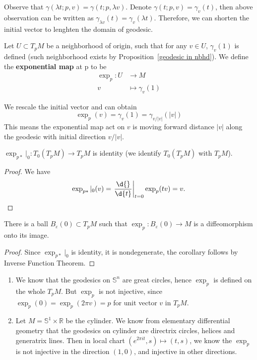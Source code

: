 Observe that $\gamma(\lambda t;p,v)=\gamma(t;p,\lambda v)$.
Denote $\gamma(t;p,v)=\gamma_v(t)$, then above observation can be written as $\gamma_{\lambda v}(t)=\gamma_v(\lambda t)$.
Therefore, we can shorten the initial vector to lenghten the domain of geodesic.

\begin{defn}
    Let $U\subset T_pM$ be a neighborhood of origin, such that for any $v\in U$, $\gamma_v(1)$ is defined (such neighborhood exists by Proposition~\ref{geodesic in nbhd}).
    We define the \textbf{exponential map} at p to be
    \begin{align*}
        \exp_p:U&\to M\\
        v&\mapsto\gamma_v(1)
    \end{align*}
\end{defn}

\begin{rem}
    We rescale the initial vector and can obtain
    \[\exp_p(v)=\gamma_v(1)=\gamma_{v/|v|}(|v|)\]
    This means the exponential map act on $v$ is moving forward distance $|v|$ along the geodesic with initial direction $v/|v|$.
\end{rem}

\begin{prop}
    $\exp_{p*}|_0:T_0(T_pM)\to T_pM$ is identity (we identify $T_0(T_pM)$ with $T_pM$).
\end{prop}
\begin{proof}
    We have
    \[\exp_{p*}|_0(v)=\left.\frac{\d{}}{\d{t}}\right|_{t=0}\exp_p(tv)=v.\qedhere\]
\end{proof}

\begin{cor}
    There is a ball $B_\varepsilon(0)\subset T_pM$ such that $\exp_p:B_\varepsilon(0)\to M$ is a diffeomorphism onto its image.
\end{cor}
\begin{proof}
    Since $\exp_{p*}|_0$ is identity, it is nondegenerate, the corollary follows by Inverse Function Theorem.
\end{proof}

\begin{eg}
    \begin{enumerate}[(1)]
        \item We know that the geodesics on $\mathbb{S}^n$ are great circles, hence $\exp_p$ is defined on the whole $T_pM$.
        But $\exp_p$ is not injective, since $\exp_p(0)=\exp_p(2\pi v)=p$ for unit vector $v$ in $T_pM$.
        \item Let $M=\mathbb{S}^1\times\mathbb{R}$ be the cylinder.
        We know from elementary differential geometry that the geodesics on cylinder are directrix circles, helices and generatrix lines.
        Then in local chart $(e^{2\pi it},s)\mapsto(t,s)$, we know the $\exp_p$ is not injective in the direction $(1,0)$, and injective in other directions.
    \end{enumerate}
\end{eg}

